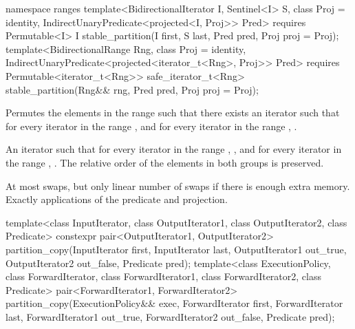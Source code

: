 \begin{addedblock}
%
\begin{itemdecl}
namespace ranges {
  template<BidirectionalIterator I, Sentinel<I> S, class Proj = identity,
      IndirectUnaryPredicate<projected<I, Proj>> Pred>
    requires Permutable<I>
    I stable_partition(I first, S last, Pred pred, Proj proj = Proj{});
  template<BidirectionalRange Rng, class Proj = identity,
      IndirectUnaryPredicate<projected<iterator_t<Rng>, Proj>> Pred>
    requires Permutable<iterator_t<Rng>>
    safe_iterator_t<Rng> stable_partition(Rng&& rng, Pred pred, Proj proj = Proj{});
}
\end{itemdecl}

\begin{itemdescr}
\pnum
\effects Permutes the elements in the range  such that there exists an iterator 
such that for every iterator  in the range 
, and for every iterator  in the
range , .

\pnum
\returns
An iterator
such that for every iterator
in the range
,
,
and for every iterator
in the range
,
.
The relative order of the elements in both groups is preserved.

\pnum
\complexity
At most
swaps, but only linear number of swaps if there is enough extra memory.
Exactly
applications of the predicate and projection.
\end{itemdescr}
\end{addedblock}

%
\begin{itemdecl}
template<class InputIterator, class OutputIterator1,
         class OutputIterator2, class Predicate>
  constexpr pair<OutputIterator1, OutputIterator2>
    partition_copy(InputIterator first, InputIterator last,
                   OutputIterator1 out_true, OutputIterator2 out_false, Predicate pred);
template<class ExecutionPolicy, class ForwardIterator, class ForwardIterator1,
         class ForwardIterator2, class Predicate>
  pair<ForwardIterator1, ForwardIterator2>
    partition_copy(ExecutionPolicy&& exec,
                   ForwardIterator first, ForwardIterator last,
                   ForwardIterator1 out_true, ForwardIterator2 out_false, Predicate pred);
\end{itemdecl}

